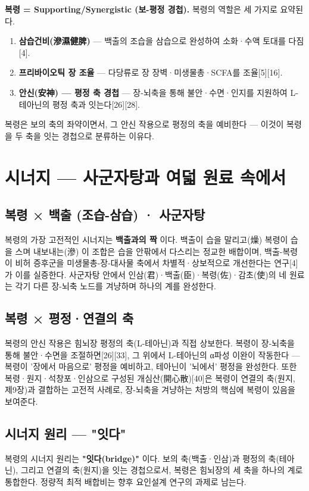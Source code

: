 \documentclass[11pt,oneside]{book}
\begin{document}
\textbf{복령 = Supporting/Synergistic (보-평정 경첩).} 복령의 역할은 세 가지로 요약된다.

\begin{enumerate}[leftmargin=6mm,itemsep=1pt,topsep=2pt]
  \item \textbf{삼습건비(滲濕健脾)} — 백출의 조습을 삼습으로 완성하여 소화·수액 토대를 다짐[4].
  \item \textbf{프리바이오틱 장 조율} — 다당류로 장 장벽·미생물총·SCFA를 조율[5][16].
  \item \textbf{안신(安神) — 평정 축 경첩} — 장-뇌축을 통해 불안·수면·인지를 지원하여 L-테아닌의 평정 축과 잇는다[26][28].
\end{enumerate}
복령은 보의 축의 좌약이면서, 그 안신 작용으로 평정의 축을 예비한다 — 이것이 복령을 두 축을 잇는 경첩으로 분류하는 이유다.

\section{시너지 — 사군자탕과 여덟 원료 속에서}
\subsection{복령 × 백출 (조습-삼습) · 사군자탕}
복령의 가장 고전적인 시너지는 \textbf{백출과의 짝} 이다. 백출이 습을 말리고(燥) 복령이 습을 스며 내보내는(滲) 이 조합은 습을 안팎에서 다스리는 정교한 배합이며, 백출-복령이 비허 증후군을 미생물총-장-대사물 축에서 차별적·상보적으로 개선한다는 연구[4]가 이를 실증한다. 사군자탕 안에서 인삼(君)·백출(臣)·복령(佐)·감초(使)의 네 원료는 각기 다른 장-뇌축 노드를 겨냥하며 하나의 계를 완성한다.

\subsection{복령 × 평정·연결의 축}
복령의 안신 작용은 힘뇌장 평정의 축(L-테아닌)과 직접 상보한다. 복령이 장-뇌축을 통해 불안·수면을 조절하면[26][33], 그 위에서 L-테아닌의 α파성 이완이 작동한다 — 복령이 '장에서 마음으로' 평정을 예비하고, 테아닌이 '뇌에서' 평정을 완성한다. 또한 복령·원지·석창포·인삼으로 구성된 개심산(開心散)[40]은 복령이 연결의 축(원지, 제9장)과 결합하는 고전적 사례로, 장-뇌축을 겨냥하는 처방의 핵심에 복령이 있음을 보여준다.

\subsection{시너지 원리 — "잇다"}
복령의 시너지 원리는 \textbf{"잇다(bridge)"} 이다. 보의 축(백출·인삼)과 평정의 축(테아닌), 그리고 연결의 축(원지)을 잇는 경첩으로서, 복령은 힘뇌장의 세 축을 하나의 계로 통합한다. 정량적 최적 배합비는 향후 요인설계 연구의 과제로 남는다.
\end{document}
